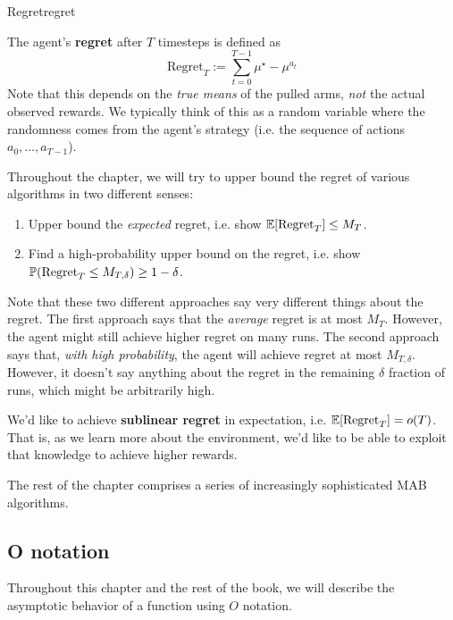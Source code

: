 \documentclass[\main/main]{subfiles}
\begin{document}
\begin{definition}{Regret}{regret}

    The agent's \textbf{regret} after $T$ timesteps is defined as
    \begin{equation}
        \text{Regret}_T := \sum_{t=0}^{T-1} \mu^\star - \mu^{a_t}
    \end{equation}
    Note that this depends on the \emph{true means} of the pulled arms, \emph{not} the actual observed rewards. We typically think of this as a random variable where the randomness comes from the agent's strategy (i.e. the sequence of actions $a_0, \dots, a_{T-1}$).

    Throughout the chapter, we will try to upper bound the regret of various algorithms in two different senses:
    \begin{enumerate}
        \item Upper bound the \emph{expected} regret, i.e. show $\E[\text{Regret}_T] \le M_T$.
        \item Find a high-probability upper bound on the regret, i.e. show $\P(\text{Regret}_T \le M_{T, \delta}) \ge 1-\delta$.
    \end{enumerate}
    Note that these two different approaches say very different things about the regret. The first approach says that the \emph{average} regret is at most $M_T$. However, the agent might still achieve higher regret on many runs. The second approach says that, \emph{with high probability}, the agent will achieve regret at most $M_{T, \delta}$. However, it doesn't say anything about the regret in the remaining $\delta$ fraction of runs, which might be arbitrarily high.

\end{definition}

We'd like to achieve \textbf{sublinear regret} in expectation, i.e. $\E[\text{Regret}_T] = o(T)$. That is, as we learn more about the environment, we'd like to be able to exploit that knowledge to achieve higher rewards.

The rest of the chapter comprises a series of increasingly sophisticated MAB algorithms.

\subsection{O notation}

Throughout this chapter and the rest of the book, we will describe the asymptotic behavior of a function using $O$ notation.
\end{document}
